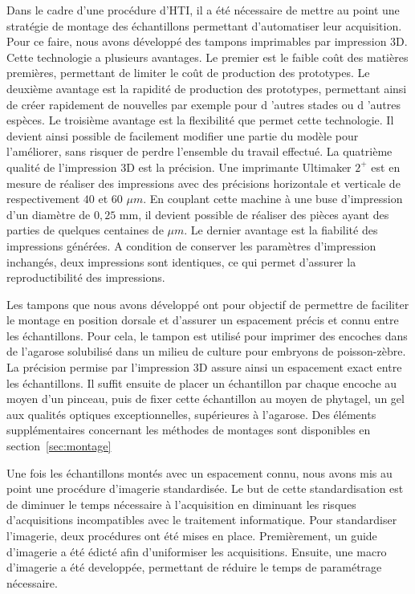 \documentclass[\main/main.tex]{subfiles}
\begin{document}
%
Dans le cadre d'une procédure d'HTI, il a été nécessaire de mettre au point une stratégie de montage des échantillons permettant d'automatiser leur acquisition.
%
Pour ce faire, nous avons développé des tampons imprimables par impression 3D.
%
Cette technologie a plusieurs avantages.
%
Le premier est le faible coût des matières premières, permettant de limiter le coût de production des prototypes.
%
Le deuxième avantage est la rapidité de production des prototypes, permettant ainsi de créer rapidement de nouvelles  par exemple pour d 'autres stades ou d 'autres espèces.
%
Le troisième avantage est la flexibilité que permet cette technologie.
%
Il devient ainsi possible de facilement modifier une partie du modèle pour l'améliorer, sans risquer de perdre l'ensemble du travail effectué.
%
La quatrième qualité de l'impression 3D est la précision.
%
Une imprimante Ultimaker $2^+$ est en mesure de réaliser des 
impressions avec des précisions horizontale et verticale de respectivement $40$ et $60$ $\mu{}m$.
%
En couplant cette machine à une buse d'impression d'un diamètre de $0,25$ mm, il devient possible de réaliser des pièces ayant des parties de quelques centaines de $\mu{}m$.
%
Le dernier avantage est la fiabilité des impressions générées.
%
A condition de conserver les paramètres d'impression inchangés, deux impressions sont identiques, ce qui permet d'assurer la reproductibilité des impressions.

\label{chapter:bio:montage}
%
Les tampons que nous avons développé ont pour objectif de permettre
de faciliter le montage en position dorsale et d'assurer un espacement
précis et connu entre les échantillons.
%
Pour cela,
le tampon est utilisé pour imprimer des encoches dans de l'agarose solubilisé dans un milieu de culture pour embryons de poisson-zèbre.
%
La précision permise par l'impression 3D assure ainsi un espacement exact entre les échantillons.
%
Il suffit ensuite de placer un échantillon par chaque encoche au moyen d'un pinceau,
puis de fixer cette échantillon au moyen de phytagel, un gel aux qualités optiques exceptionnelles, supérieures à l'agarose.
%
Des éléments supplémentaires concernant les méthodes de montages sont disponibles en section~\ref{sec:montage}

%
Une fois les échantillons montés avec un espacement connu,
nous avons mis au point une procédure d'imagerie standardisée.
%
Le but de cette standardisation est de diminuer le temps nécessaire à l'acquisition
en diminuant les risques d'acquisitions incompatibles avec le traitement informatique.
%
Pour standardiser l'imagerie, deux procédures ont été mises en place.
%
Premièrement, un guide d'imagerie a été édicté afin d'uniformiser les acquisitions.
%
Ensuite, une macro d'imagerie a été developpée, permettant de réduire le temps
de paramétrage nécessaire.
\end{document}
